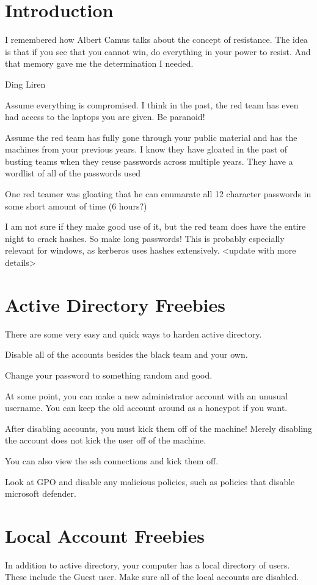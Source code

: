 \documentclass{article}
\begin{document}
\graphicspath{ {./Images/} }
\tableofcontents

\section{Introduction}
\epigraph{I remembered how Albert Camus talks about the concept of resistance. 
The idea is that if you see that you cannot win, do everything in your power to resist. And that memory gave me the determination I needed.}
{Ding Liren}

Assume everything is compromised. I think in the past, the red team has even had access to the laptops you are given. Be paranoid!

Assume the red team has fully gone through your public material and has the machines from your previous years.
I know they have gloated in the past of busting teams when they reuse passwords across multiple years.
They have a wordlist of all of the passwords used 

One red teamer was gloating that he can enumarate all 12 character passwords in some short amount of time (6 hours?)

I am not sure if they make good use of it, but the red team does have the entire night to crack hashes. So make long passwords!
This is probably especially relevant for windows, as kerberos uses hashes extensively. <update with more details>

\section{Active Directory Freebies}
There are some very easy and quick ways to harden active directory. 

Disable all of the accounts besides the black team and your own.

Change your password to something random and good. 

At some point, you can make a new administrator account with an unusual username. You can keep the old account around as a honeypot if you want.

After disabling accounts, you must kick them off of the machine! Merely disabling the account does not kick the user off of the machine.

You can also view the ssh connections and kick them off.

Look at GPO and disable any malicious policies, such as policies that disable microsoft defender.


\section{Local Account Freebies}
In addition to active directory, your computer has a local directory of users. These include the Guest user.
Make sure all of the local accounts are disabled. 
\end{document}
